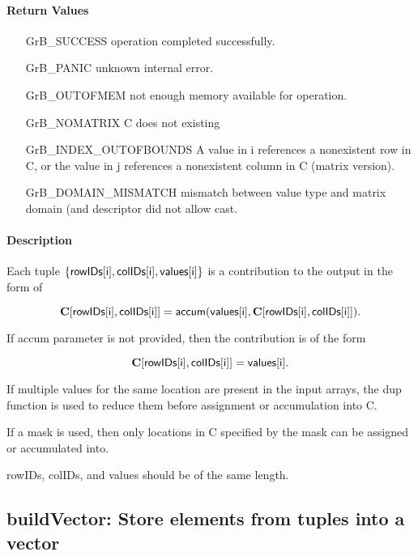 \paragraph{Return Values}

\begin{itemize}[leftmargin=2.1in]
\item[{\sf GrB\_SUCCESS}]      operation completed successfully.
\item[{\sf GrB\_PANIC}]        unknown internal error.
\item[{\sf GrB\_OUTOFMEM}]     not enough memory available for operation.
\item[{\sf GrB\_NOMATRIX}]     C does not existing
\item[{\sf GrB\_INDEX\_OUTOFBOUNDS}]
        A value in i references a nonexistent row in C, or
        the value in j references a nonexistent column in C (matrix version).
\item[\sf GrB\_DOMAIN\_MISMATCH]  
       mismatch between value type and matrix domain (and descriptor did not allow cast.
\end{itemize}


\paragraph{Description}
Each tuple $\{ {\sf rowIDs[i]}, {\sf colIDs[i]}, {\sf values[i]}\}$ is a contribution to the output in the form of 

$${\bf C}[{\sf rowIDs[i]},{\sf colIDs[i]}] = {\sf accum}({\sf values[i]}, {\bf C}[{\sf rowIDs[i]}, {\sf colIDs[i]}]).$$

If {\sf accum} parameter is not provided, then the contribution is of the form 

$${\bf C}[{\sf rowIDs[i]}, {\sf colIDs[i]}] = {\sf values[i]}.$$

If multiple values for the same location are present in the input arrays, the 
dup function is used to reduce them before assignment or accumulation into {\sf C}.

If a mask is used, then only locations in {\sf C} specified by the mask can be assigned or
accumulated into.
 
{\sf rowIDs}, {\sf colIDs}, and {\sf values} should be of the same length. 

\subsection{{\sf buildVector}: Store elements from tuples into a vector}
\label{Sec:buildVector}

